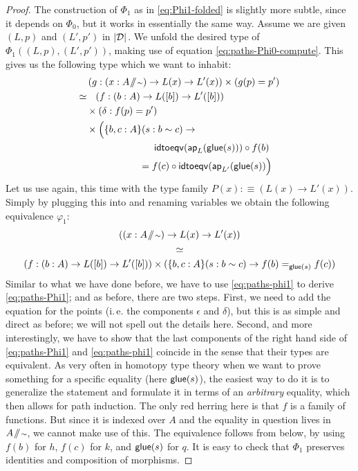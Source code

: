 \begin{proof}
The construction of $\Phi_1$ as in \eqref{eq:Phi1-folded} is slightly
more subtle, since it depends on $\Phi_0$, but it works in essentially the same way.
Assume we are given $(L, p)$ and $(L', p')$ in $\mathopen{}\left|\mathcal D\right|_{}^{}\mathclose{}$.
We unfold the desired type of $\Phi_1((L,p),(L',p'))$, making use of
equation \eqref{eq:paths-Phi0-compute}.
This gives us the following type which we want to inhabit:
 \begin{equation} \label{eq:paths-Phi1}
  \begin{alignedat}{2}
   &&& \left(g : (x : A \! \sslash \! {\scriptstyle \sim}) \to L(x) \to L'(x)\right) \times \left(g(p) = p'\right) \\
   \simeq &&& \phantom{\times} \left(f : (b : A) \to L([b]) \to L'([b])  \right) \\
           &&& \times (\delta: f(p) = p') \\
           &&& \times \Bigl( \{b,c : A\} (s : b \sim c) \to \\
           &&& \phantom{=========} \mathsf{idtoeqv}(\mathsf{ap}_L(\mathsf{glue}(s))) \circ f(b)  \\
           &&& \phantom{=======} = f(c) \circ \mathsf{idtoeqv}(\mathsf{ap}_{L'}(\mathsf{glue}(s)) \Bigr)
  \end{alignedat}
 \end{equation}
Let us use  again, this time with the
type family $P(x) :\equiv (L(x) \to L'(x))$.
Simply by plugging this into  and renaming variables
we obtain the following equivalence $\varphi_1$:
\begin{equation}\label{eq:paths-phi1}
\begin{gathered}
((x : A \! \sslash \! {\scriptstyle \sim}) \to L(x) \to L'(x)) \\
\simeq \\
(f : (b : A) \to L([b]) \to L'([b])) \times (\{b, c : A\}(s : b \sim c) \to f(b) =_{\mathsf{glue}(s)} f(c))
\end{gathered}
\end{equation}
Similar to what we have done before, we have to use \eqref{eq:paths-phi1}
to derive \eqref{eq:paths-Phi1};
and as before, there are two steps.
First, we need to add the equation for the points (i.\,e. the components $\epsilon$
and $\delta$), but this is as simple and direct as before; we will not spell
out the details here.
Second, and more interestingly, we have to show that the last components of
the right hand side of
\eqref{eq:paths-Phi1} and \eqref{eq:paths-phi1} coincide in the sense
that their types are equivalent.
As very often in homotopy type theory when we want to prove something for
a specific equality (here $\mathsf{glue}(s)$), the easiest way to do it is to
generalize the statement and formulate it in terms of an \emph{arbitrary}
equality,
which then allows for path induction.
The only red herring here is that $f$ is a family of functions.
But since it is indexed over $A$ and the equality in question lives in $A \! \sslash \! {\scriptstyle \sim}$,
we cannot make use of this.
The equivalence follows from  below,
by using $f(b)$ for $h$, $f(c)$ for $k$, and $\mathsf{glue}(s)$ for $q$.
It is easy to check that $\Phi_1$ preserves identities and composition of
morphisms.
\end{proof}

